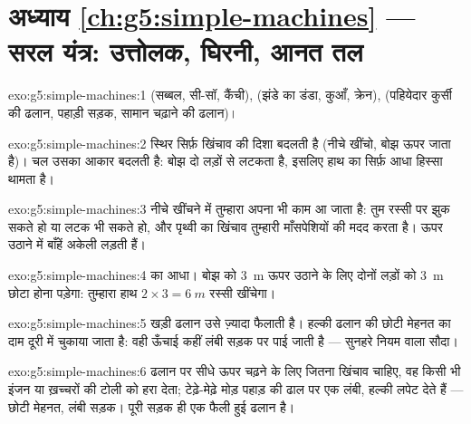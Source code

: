 \section*{अध्याय \ref{ch:g5:simple-machines} --- सरल यंत्र: उत्तोलक, घिरनी, आनत तल}

\begin{solution}{exo:g5:simple-machines:1}
 (सब्बल, सी-सॉ, कैंची),  (झंडे का डंडा, कुआँ, क्रेन),
 (पहियेदार कुर्सी की ढलान, पहाड़ी सड़क, सामान चढ़ाने की ढलान)।
\end{solution}

\begin{solution}{exo:g5:simple-machines:2}
स्थिर  सिर्फ़ खिंचाव की दिशा बदलती है (नीचे खींचो, बोझ ऊपर
जाता है)। चल  उसका आकार बदलती है: बोझ दो लड़ों से लटकता है,
इसलिए हाथ  का सिर्फ़ आधा हिस्सा थामता है।
\end{solution}

\begin{solution}{exo:g5:simple-machines:3}
नीचे खींचने में तुम्हारा अपना  भी काम आ जाता है: तुम रस्सी पर झुक
सकते हो या लटक भी सकते हो, और पृथ्वी का खिंचाव तुम्हारी माँसपेशियों
की मदद करता है। ऊपर उठाने में बाँहें अकेली लड़ती हैं।
\end{solution}

\begin{solution}{exo:g5:simple-machines:4}
 का आधा। बोझ को \qty{3}{m} ऊपर उठाने के लिए दोनों लड़ों को
\qty{3}{m} छोटा होना पड़ेगा: तुम्हारा हाथ $2 \times 3 = \qty{6}{m}$
रस्सी खींचेगा।
\end{solution}

\begin{solution}{exo:g5:simple-machines:5}
खड़ी ढलान उसे ज़्यादा फैलाती है। हल्की ढलान की छोटी मेहनत का दाम दूरी
में चुकाया जाता है: वही ऊँचाई कहीं लंबी सड़क पर पाई जाती है ---
सुनहरे नियम वाला सौदा।
\end{solution}

\begin{solution}{exo:g5:simple-machines:6}
ढलान पर सीधे ऊपर चढ़ने के लिए जितना खिंचाव चाहिए, वह किसी भी इंजन या
ख़च्चरों की टोली को हरा देता; टेढ़े-मेढ़े मोड़ पहाड़ की ढाल पर एक
लंबी, हल्की  लपेट देते हैं --- छोटी मेहनत, लंबी सड़क। पूरी सड़क
ही एक फैली हुई ढलान है।
\end{solution}

